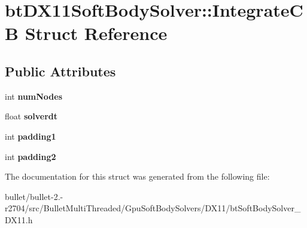 \hypertarget{structbt_d_x11_soft_body_solver_1_1_integrate_c_b}{\section{bt\+D\+X11\+Soft\+Body\+Solver\+:\+:Integrate\+C\+B Struct Reference}
\label{structbt_d_x11_soft_body_solver_1_1_integrate_c_b}
}
\subsection*{Public Attributes}
\begin{DoxyCompactItemize}
\item 
\hypertarget{structbt_d_x11_soft_body_solver_1_1_integrate_c_b_a47b57acf5bb6bb8267faeb36c4b8737d}{int {\bfseries num\+Nodes}}\label{structbt_d_x11_soft_body_solver_1_1_integrate_c_b_a47b57acf5bb6bb8267faeb36c4b8737d}

\item 
\hypertarget{structbt_d_x11_soft_body_solver_1_1_integrate_c_b_a9986c99f3fdd10839590d6d56d8af0f0}{float {\bfseries solverdt}}\label{structbt_d_x11_soft_body_solver_1_1_integrate_c_b_a9986c99f3fdd10839590d6d56d8af0f0}

\item 
\hypertarget{structbt_d_x11_soft_body_solver_1_1_integrate_c_b_a414d1dae69ed7b43ebd817bce3c3e48e}{int {\bfseries padding1}}\label{structbt_d_x11_soft_body_solver_1_1_integrate_c_b_a414d1dae69ed7b43ebd817bce3c3e48e}

\item 
\hypertarget{structbt_d_x11_soft_body_solver_1_1_integrate_c_b_ab2598bcc288783dbcb98711a18f100e0}{int {\bfseries padding2}}\label{structbt_d_x11_soft_body_solver_1_1_integrate_c_b_ab2598bcc288783dbcb98711a18f100e0}

\end{DoxyCompactItemize}


The documentation for this struct was generated from the following file\+:\begin{DoxyCompactItemize}
\item 
bullet/bullet-\/2.-\/r2704/src/\+Bullet\+Multi\+Threaded/\+Gpu\+Soft\+Body\+Solvers/\+D\+X11/bt\+Soft\+Body\+Solver\+\_\+\+D\+X11.\+h\end{DoxyCompactItemize}
